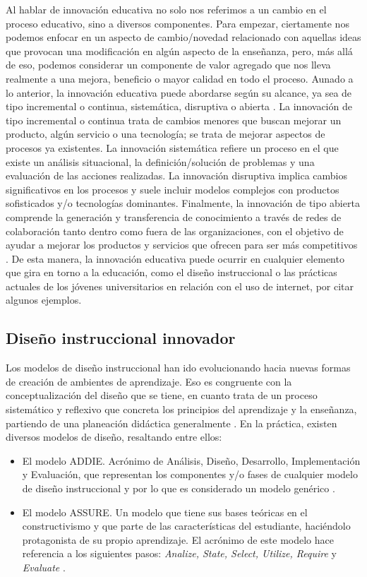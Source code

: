\documentclass[spanish]{textolivre}
\begin{document}
Al hablar de innovación educativa no solo nos referimos a un cambio en el proceso educativo, sino a diversos componentes. Para empezar, ciertamente nos podemos enfocar en un aspecto de cambio/novedad relacionado con aquellas ideas que provocan una modificación en algún aspecto de la enseñanza, pero, más allá de eso, podemos considerar un componente de valor agregado que nos lleva realmente a una mejora, beneficio o mayor calidad en todo el proceso. Aunado a lo anterior, la innovación educativa puede abordarse según su alcance, ya sea de tipo incremental o continua, sistemática, disruptiva o abierta \cite{garcia-gonzalez2019}. La innovación de tipo incremental o continua trata de cambios menores que buscan mejorar un producto, algún servicio o una tecnología; se trata de mejorar aspectos de procesos ya existentes. La innovación sistemática refiere un proceso en el que existe un análisis situacional, la definición/solución de problemas y una evaluación de las acciones realizadas. La innovación disruptiva implica cambios significativos en los procesos y suele incluir modelos complejos con productos sofisticados y/o tecnologías dominantes. Finalmente, la innovación de tipo abierta comprende la generación y transferencia de conocimiento a través de redes de colaboración tanto dentro como fuera de las organizaciones, con el objetivo de ayudar a mejorar los productos y servicios que ofrecen para ser más competitivos \cite{miranda2019}. De esta manera, la innovación educativa puede ocurrir en cualquier elemento que gira en torno a la educación, como el diseño instruccional o las prácticas actuales de los jóvenes universitarios en relación con el uso de internet, por citar algunos ejemplos.

\subsection{Diseño instruccional innovador}
Los modelos de diseño instruccional han ido evolucionando hacia nuevas formas de creación de ambientes de aprendizaje. Eso es congruente con la conceptualización del diseño que se tiene, en cuanto trata de un proceso sistemático y reflexivo que concreta los principios del aprendizaje y la enseñanza, partiendo de una planeación didáctica generalmente \cite{brown2016}. En la práctica, existen diversos modelos de diseño, resaltando entre ellos:

\begin{itemize}
    \item El modelo ADDIE. Acrónimo de Análisis, Diseño, Desarrollo, Implementación y Evaluación, que representan los componentes y/o fases de cualquier modelo de diseño instruccional y por lo que es considerado un modelo genérico \cite{dominguez_perez2018}.
    \item El modelo ASSURE. Un modelo que tiene sus bases teóricas en el constructivismo y que parte de las características del estudiante, haciéndolo protagonista de su propio aprendizaje. El acrónimo de este modelo  hace referencia a los siguientes pasos: \emph{Analize, State, Select, Utilize, Require} y \emph{Evaluate} \cite{mora2017}.
\end{itemize}
\end{document}
